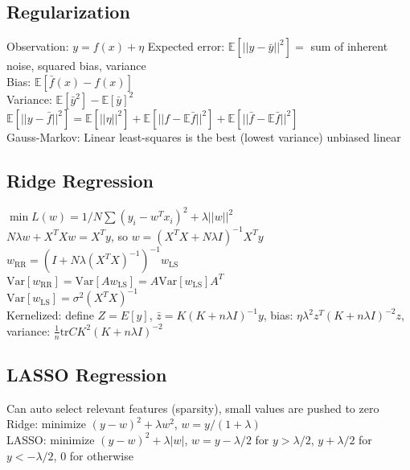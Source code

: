 \subsection*{Regularization}

Observation: $y = f(x) + \eta$
Expected error: $\mathbb{E}[||y - \bar{y}||^2] =$ sum of inherent noise, squared bias, variance\\
Bias: $\mathbb{E}[\bar{f}(x) - f(x)]$\\
Variance: $\mathbb{E}[\bar{y}^2] - \mathbb{E}[\bar{y}]^2$\\
$\mathbb{E}[||y - \bar{f}||^2] = \mathbb{E}[||\eta||^2] + \mathbb{E}[||f - \mathbb{E}\bar{f}||^2] + \mathbb{E}[||\bar{f} - \mathbb{E}\bar{f}||^2]$\\
Gauss-Markov: Linear least-squares is the best (lowest variance) unbiased linear\\

\subsection*{Ridge Regression}

$\min L(w) = 1/N \sum(y_i - w^T x_i)^2 + \lambda ||w||^2$\\
$N \lambda w + X^T X w = X^T y$, so $w = (X^T X + N \lambda I)^{-1} X^T y$\\
$w_{\text{RR}} = (I + N \lambda (X^T X)^{-1})^{-1} w_{\text{LS}}$\\
$\text{Var}[w_{\text{RR}}] = \text{Var}[A w_{\text{LS}}] = A \text{Var}[w_{\text{LS}}] A^T$\\
$\text{Var}[w_{\text{LS}}] = \sigma^2 (X^T X)^{-1}$\\
Kernelized: define $Z = E[y]$, $\bar{z} = K(K+n\lambda I)^{-1}y$, bias: $\eta \lambda^2 z^T (K + n\lambda I)^{-2} z$, variance: $\frac{1}{n}\text{tr} C K^2 (K+n\lambda I)^{-2}$\\

\subsection*{LASSO Regression}

Can auto select relevant features (sparsity), small values are pushed to zero\\
Ridge: minimize $(y-w)^2 + \lambda w^2$, $w = y/(1+\lambda)$\\
LASSO: minimize $(y-w)^2 + \lambda |w|$, $w = y-\lambda/2$ for $y > \lambda/2$, $y + \lambda / 2$ for $y < -\lambda/2$, $0$ for otherwise\\

